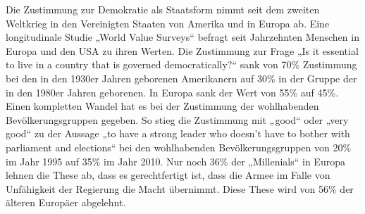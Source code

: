 \documentclass[paper=a4,oneside,abstract]{scrartcl}
\begin{document}
Die Zustimmung zur Demokratie als Staatsform nimmt seit dem zweiten Weltkrieg in den Vereinigten Staaten von Amerika und in Europa ab. Eine longitudinale Studie „World Value Surveys“ befragt seit Jahrzehnten Menschen in Europa und den USA zu ihren Werten. Die Zustimmung zur Frage „Is it essential to live in a country that is governed democratically?“ sank von 70\% Zustimmung bei den in den 1930er Jahren geborenen Amerikanern auf 30\% in der Gruppe der in den 1980er Jahren geborenen. In Europa sank der Wert von 55\% auf 45\%. Einen kompletten Wandel hat es bei der Zustimmung der wohlhabenden Bevölkerungsgruppen gegeben. So stieg die Zustimmung mit „good“ oder „very good“ zu der Aussage „to have a strong leader who doesn't have to bother with parliament and elections“ bei den wohlhabenden Bevölkerungsgruppen von 20\% im Jahr 1995 auf 35\% im Jahr 2010. Nur noch 36\% der „Millenials“ in Europa lehnen die These ab, dass es gerechtfertigt ist, dass die Armee im Falle von Unfähigkeit der Regierung die Macht übernimmt. Diese These wird von 56\% der älteren Europäer abgelehnt. \cite{foa16}
\end{document}
